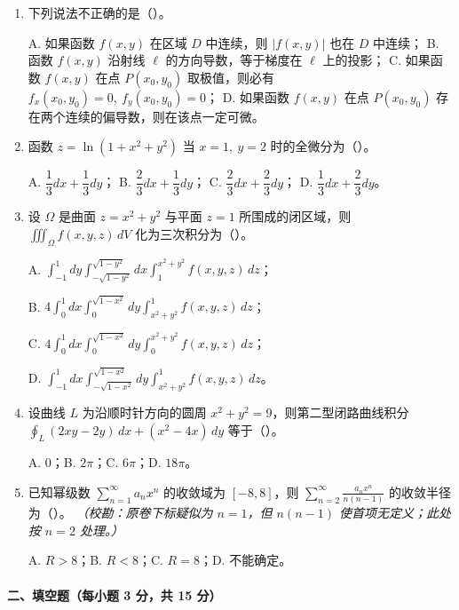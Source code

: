 \begin{enumerate}
  \item 下列说法不正确的是（\quad）。

  A. 如果函数 $f(x,y)$ 在区域 $D$ 中连续，则 $|f(x,y)|$ 也在 $D$ 中连续；\quad
  B. 函数 $f(x,y)$ 沿射线 $\ell$ 的方向导数，等于梯度在 $\ell$ 上的投影；\quad
  C. 如果函数 $f(x,y)$ 在点 $P(x_0,y_0)$ 取极值，则必有 $f_x(x_0,y_0)=0,\ f_y(x_0,y_0)=0$；\quad
  D. 如果函数 $f(x,y)$ 在点 $P(x_0,y_0)$ 存在两个连续的偏导数，则在该点一定可微。

  \item 函数 $z=\ln(1+x^2+y^2)$ 当 $x=1,\ y=2$ 时的全微分为（\quad）。

  A. $\dfrac13dx+\dfrac13dy$；\quad
  B. $\dfrac23dx+\dfrac13dy$；\quad
  C. $\dfrac23dx+\dfrac23dy$；\quad
  D. $\dfrac13dx+\dfrac23dy$。

  \item 设 $\Omega$ 是曲面 $z=x^2+y^2$ 与平面 $z=1$ 所围成的闭区域，则 $\iiint_{\Omega}f(x,y,z)\,dV$ 化为三次积分为（\quad）。

  A. $\displaystyle\int_{-1}^{1}dy\int_{-\sqrt{1-y^2}}^{\sqrt{1-y^2}}dx\int_1^{x^2+y^2}f(x,y,z)\,dz$；

  B. $\displaystyle4\int_0^1dx\int_0^{\sqrt{1-x^2}}dy\int_{x^2+y^2}^{1}f(x,y,z)\,dz$；

  C. $\displaystyle4\int_0^1dx\int_0^{\sqrt{1-x^2}}dy\int_0^{x^2+y^2}f(x,y,z)\,dz$；

  D. $\displaystyle\int_{-1}^{1}dx\int_{-\sqrt{1-x^2}}^{\sqrt{1-x^2}}dy\int_{x^2+y^2}^{1}f(x,y,z)\,dz$。

  \item 设曲线 $L$ 为沿顺时针方向的圆周 $x^2+y^2=9$，则第二型闭路曲线积分 \(\displaystyle \oint_L (2xy-2y)\,dx+(x^2-4x)\,dy\)
  等于（\quad）。

  A. $0$；\quad B. $2\pi$；\quad C. $6\pi$；\quad D. $18\pi$。

  \item 已知幂级数 $\sum_{n=1}^{\infty}a_nx^n$ 的收敛域为 $[-8,8]$，则 \(\displaystyle \sum_{n=2}^{\infty}\frac{a_nx^n}{n(n-1)}\)
  的收敛半径为（\quad）。
  \textit{（校勘：原卷下标疑似为 $n=1$，但 $n(n-1)$ 使首项无定义；此处按 $n=2$ 处理。）}

  A. $R>8$；\quad B. $R<8$；\quad C. $R=8$；\quad D. 不能确定。
\end{enumerate}

\paragraph*{二、填空题（每小题 3 分，共 15 分）}

